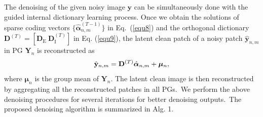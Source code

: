 \documentclass[10pt,twocolumn,letterpaper]{article}
\begin{document}
The denoising of the given noisy image $\mathbf{y}$ can be simultaneously done with the guided internal dictionary learning process. Once we obtain the solutions of sparse coding vectors $\{\hat{\bm{\alpha}}_{n,m}^{(T-1)}\}$ in Eq.\ (\ref{equ8}) and the orthogonal dictionary $\mathbf{D}^{(T)} = [\mathbf{D}_{\text{E}}\ \mathbf{D}_{\text{I}}^{(T)}]$ in Eq. (\ref{equ9}), the latent clean patch of a noisy patch $\hat{\mathbf{y}}_{n,m}$ in PG $\mathbf{Y}_{n}$ is reconstructed as
\vspace{-2mm}
\begin{equation}\label{equ11}\vspace{-2mm}
\hat{\mathbf{y}}_{n,m}=\mathbf{D}^{(T)}\hat{\bm{\alpha}}_{n,m}+\bm{\mu}_{n},
\end{equation}
where $\bm{\mu}_{n}$ is the group mean of $\mathbf{Y}_{n}$. The latent clean image is then reconstructed by aggregating all the reconstructed patches in all PGs.\ We perform the above denoising procedures for several iterations for better denoising outputs.\ The proposed denoising algorithm is summarized in Alg. 1.
\end{document}
